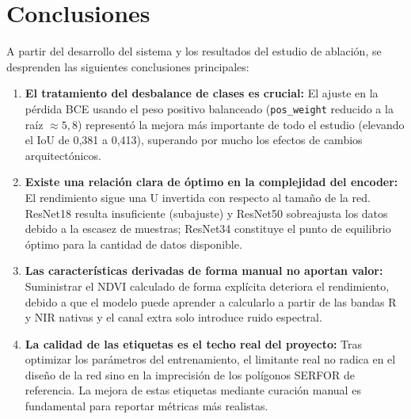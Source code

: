 \documentclass{article}
\begin{document}
\section{Conclusiones}
A partir del desarrollo del sistema y los resultados del estudio de ablación, se desprenden las siguientes conclusiones principales:
\begin{enumerate}
    \item \textbf{El tratamiento del desbalance de clases es crucial:} El ajuste en la pérdida BCE usando el peso positivo balanceado (\texttt{pos\_weight} reducido a la raíz $\approx 5{,}8$) representó la mejora más importante de todo el estudio (elevando el IoU de 0,381 a 0,413), superando por mucho los efectos de cambios arquitectónicos.
    \item \textbf{Existe una relación clara de óptimo en la complejidad del encoder:} El rendimiento sigue una U invertida con respecto al tamaño de la red. ResNet18 resulta insuficiente (subajuste) y ResNet50 sobreajusta los datos debido a la escasez de muestras; ResNet34 constituye el punto de equilibrio óptimo para la cantidad de datos disponible.
    \item \textbf{Las características derivadas de forma manual no aportan valor:} Suministrar el NDVI calculado de forma explícita deteriora el rendimiento, debido a que el modelo puede aprender a calcularlo a partir de las bandas R y NIR nativas y el canal extra solo introduce ruido espectral.
    \item \textbf{La calidad de las etiquetas es el techo real del proyecto:} Tras optimizar los parámetros del entrenamiento, el limitante real no radica en el diseño de la red sino en la imprecisión de los polígonos SERFOR de referencia. La mejora de estas etiquetas mediante curación manual es fundamental para reportar métricas más realistas.
\end{enumerate}

\end{document}
